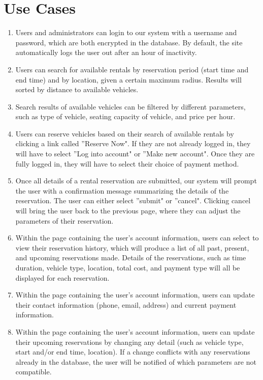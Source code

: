 \documentclass[12pt]{article}
\begin{document}
\section{Use Cases}
\begin{enumerate}

\item Users and administrators can login to our system with a username and password, which are both encrypted in the database. By default, the site automatically logs the user out after an hour of inactivity. 

\item Users can search for available rentals by reservation period (start time and end time) and by location, given a certain maximum radius. Results will sorted by distance to available vehicles.

\item Search results of available vehicles can be filtered by different parameters, such as type of vehicle, seating capacity of vehicle, and price per hour.

\item Users can reserve vehicles based on their search of available rentals by clicking a link called ''Reserve Now". If they are not already logged in, they will have to select ''Log into account" or ''Make new account". Once they are fully logged in, they will have to select their choice of payment method.

\item Once all details of a rental reservation are submitted, our system will prompt the user with a confirmation message summarizing the details of the reservation. The user can either select ''submit" or ''cancel". Clicking cancel will bring the user back to the previous page, where they can adjust the parameters of their reservation.

\item Within the page containing the user's account information, users can select to view their reservation history, which will produce a list of all past, present, and upcoming reservations made. Details of the reservations, such as time duration, vehicle type, location, total cost, and payment type will all be displayed for each reservation.

\item Within the page containing the user's account information, users can update their contact information (phone, email, address) and current payment information.

\item Within the page containing the user's account information, users can update their upcoming reservations by changing any detail (such as vehicle type, start and/or end time, location). If a change conflicts with any reservations already in the database, the user will be notified of which parameters are not compatible.


\end{enumerate}
\end{document}
